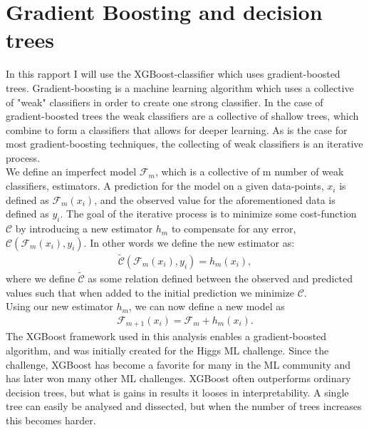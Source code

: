 \section{Gradient Boosting and decision trees}
In this rapport I will use the XGBoost-classifier which uses gradient-boosted trees. Gradient-boosting is a machine learning algorithm which uses a collective of "weak" classifiers in order to create one strong classifier. In the case of gradient-boosted trees the weak classifiers are a collective of shallow trees, which combine to form a classifiers that allows for deeper learning. As is the case for most gradient-boosting techniques, the collecting of weak classifiers is an iterative process.
\\
We define an imperfect model $\mathcal{F}_m$, which is a collective of m number of weak classifiers, estimators. A prediction for the model on a given data-points, $x_i$ is defined as $\mathcal{F}_m(x_i)$, and the observed value for the aforementioned data is defined as $y_i$. The goal of the iterative process is to minimize some cost-function $\mathcal{C}$ by introducing a new estimator $h_m$ to compensate for any error, $\mathcal{C}(\mathcal{F}_m(x_i), y_i)$. In other words we define the new estimator as:
\begin{align}
    \tilde{\mathcal{C}}(\mathcal{F}_m(x_i), y_i) = h_m(x_i),
\end{align}
where we define $\tilde{\mathcal{C}}$ as some relation defined between the observed and predicted values such that when added to the initial prediction we minimize $\mathcal{C}$.
\\
Using our new estimator $h_m$, we can now define a new model as
\begin{align}
    \mathcal{F}_{m+1}(x_i) = \mathcal{F}_m + h_m (x_i).
\end{align}
The XGBoost \cite{XGB} framework used in this analysis enables a gradient-boosted algorithm, and was initially created for the Higgs ML challenge. Since the challenge, XGBoost has become a favorite for many in the ML community and has later won many other ML challenges. XGBoost often outperforms ordinary decision trees, but what is gains in results it looses in interpretability. A single tree can easily be analysed and dissected, but when the number of trees increases this becomes harder. 